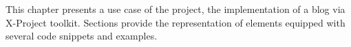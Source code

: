 This chapter presents a use case of the project, the implementation of a blog via X-Project toolkit.
Sections provide the representation of elements equipped with several code snippets and examples.
